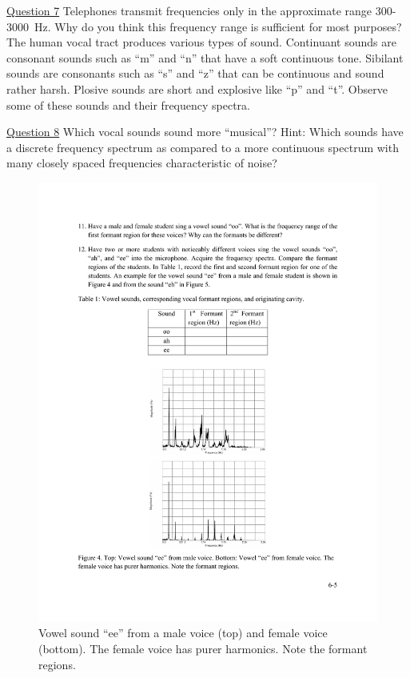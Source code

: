 \documentclass[11pt]{NSF}
\begin{document}
\underline{Question 7} Telephones transmit frequencies only in the approximate range
300-3000~Hz. Why do you think this frequency range is 
sufficient for most purposes? \\

The human vocal tract produces various types of sound. Continuant sounds are consonant sounds
such as “m” and “n” that have a soft continuous tone. Sibilant sounds are consonants such as “s”
and “z” that can be continuous and sound rather harsh. Plosive sounds are short and explosive
like “p” and “t”. Observe some of these sounds and their frequency spectra.

\underline{Question 8} Which vocal sounds sound more “musical”? Hint: Which sounds have a discrete frequency
spectrum as compared to a more continuous spectrum with many closely spaced frequencies
characteristic of noise? 
%
\begin{figure}[hbtp]
\begin{center}
\includegraphics[width=.6\textwidth]{fig6_4}
\caption{Vowel sound ``ee” from a male voice (top) and 
female voice (bottom). 
The female voice has purer harmonics. 
Note the formant regions.}
\label{f:4}
\end{center}
\end{figure}
\end{document}
